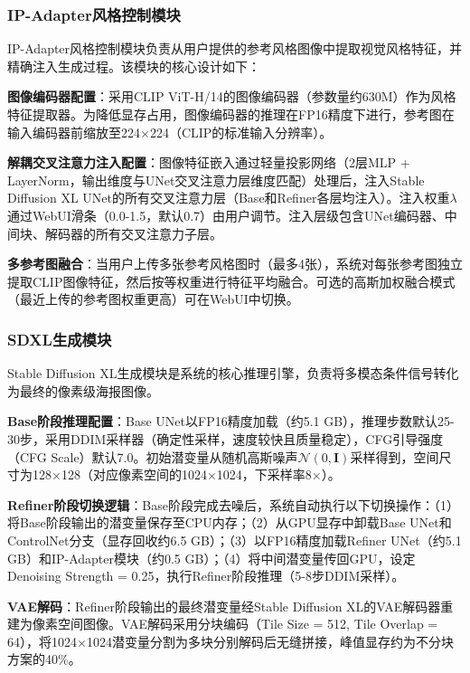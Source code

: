 \documentclass[12pt,a4paper]{ctexart}
\newcommand{\sdxl}{Stable Diffusion XL}
\newcommand{\controlnet}{ControlNet}
\newcommand{\ipadapter}{IP-Adapter}
\begin{document}
\subsubsection{IP-Adapter风格控制模块}

\ipadapter{}风格控制模块负责从用户提供的参考风格图像中提取视觉风格特征，并精确注入生成过程。该模块的核心设计如下：

\textbf{图像编码器配置}：采用CLIP ViT-H/14的图像编码器（参数量约630M）作为风格特征提取器。为降低显存占用，图像编码器的推理在FP16精度下进行，参考图在输入编码器前缩放至224$\times$224（CLIP的标准输入分辨率）。

\textbf{解耦交叉注意力注入配置}：图像特征嵌入通过轻量投影网络（2层MLP + LayerNorm，输出维度与UNet交叉注意力层维度匹配）处理后，注入\sdxl{} UNet的所有交叉注意力层（Base和Refiner各层均注入）。注入权重$\lambda$通过WebUI滑条（0.0-1.5，默认0.7）由用户调节。注入层级包含UNet编码器、中间块、解码器的所有交叉注意力子层。

\textbf{多参考图融合}：当用户上传多张参考风格图时（最多4张），系统对每张参考图独立提取CLIP图像特征，然后按等权重进行特征平均融合。可选的高斯加权融合模式（最近上传的参考图权重更高）可在WebUI中切换。

\subsubsection{SDXL生成模块}

\sdxl{}生成模块是系统的核心推理引擎，负责将多模态条件信号转化为最终的像素级海报图像。

\textbf{Base阶段推理配置}：Base UNet以FP16精度加载（约5.1 GB），推理步数默认25-30步，采用DDIM采样器（确定性采样，速度较快且质量稳定），CFG引导强度（CFG Scale）默认7.0。初始潜变量从随机高斯噪声$\mathcal{N}(0, \mathbf{I})$采样得到，空间尺寸为128$\times$128（对应像素空间的1024$\times$1024，下采样率8$\times$）。

\textbf{Refiner阶段切换逻辑}：Base阶段完成去噪后，系统自动执行以下切换操作：（1）将Base阶段输出的潜变量保存至CPU内存；（2）从GPU显存中卸载Base UNet和\controlnet{}分支（显存回收约6.5 GB）；（3）以FP16精度加载Refiner UNet（约5.1 GB）和\ipadapter{}模块（约0.5 GB）；（4）将中间潜变量传回GPU，设定Denoising Strength = 0.25，执行Refiner阶段推理（5-8步DDIM采样）。

\textbf{VAE解码}：Refiner阶段输出的最终潜变量经\sdxl{}的VAE解码器重建为像素空间图像。VAE解码采用分块编码（Tile Size = 512, Tile Overlap = 64），将1024$\times$1024潜变量分割为多块分别解码后无缝拼接，峰值显存约为不分块方案的40\%。
\end{document}
